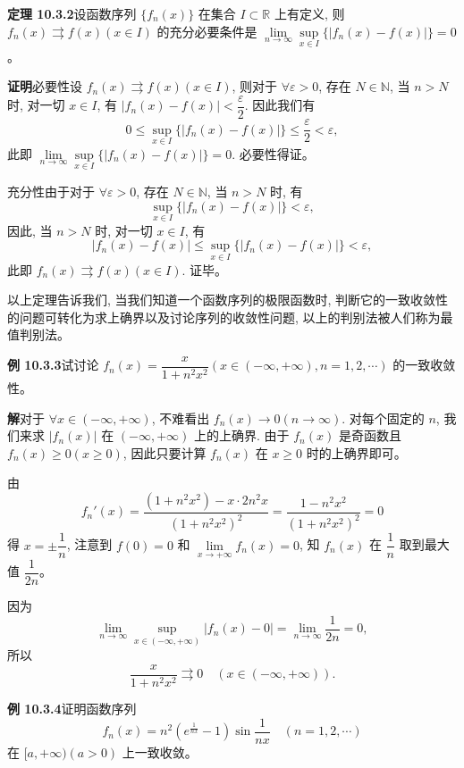 \documentclass[UTF8,12pt,a4paper,fontset=fandol]{ctexart}
\begin{document}
\noindent\textbf{定理 10.3.2}\quad 设函数序列 $\{f_n(x)\}$ 在集合 $I\subset\mathbb R$ 上有定义, 则 $f_n(x)\rightrightarrows f(x)(x\in I)$ 的充分必要条件是 $\lim\limits_{n\to\infty}\sup\limits_{x\in I}\{|f_n(x)-f(x)|\}=0$。

\noindent\textbf{证明}\quad 必要性\quad 设 $f_n(x)\rightrightarrows f(x)(x\in I)$, 则对于 $\forall\varepsilon>0$, 存在 $N\in\mathbb N$, 当 $n>N$ 时, 对一切 $x\in I$, 有 $|f_n(x)-f(x)|<\dfrac\varepsilon2$. 因此我们有
\[
  0\leq \sup_{x\in I}\{|f_n(x)-f(x)|\}\leq\frac\varepsilon2<\varepsilon,
\]
此即 $\lim\limits_{n\to\infty}\sup\limits_{x\in I}\{|f_n(x)-f(x)|\}=0$. 必要性得证。

充分性\quad 由于对于 $\forall\varepsilon>0$, 存在 $N\in\mathbb N$, 当 $n>N$ 时, 有
\[
  \sup_{x\in I}\{|f_n(x)-f(x)|\}<\varepsilon,
\]
因此, 当 $n>N$ 时, 对一切 $x\in I$, 有
\[
  |f_n(x)-f(x)|\leq \sup_{x\in I}\{|f_n(x)-f(x)|\}<\varepsilon,
\]
此即 $f_n(x)\rightrightarrows f(x)(x\in I)$. 证毕。

以上定理告诉我们, 当我们知道一个函数序列的极限函数时, 判断它的一致收敛性的问题可转化为求上确界以及讨论序列的收敛性问题, 以上的判别法被人们称为最值判别法。

\noindent\textbf{例 10.3.3}\quad 试讨论 $f_n(x)=\dfrac{x}{1+n^2x^2}(x\in(-\infty,+\infty), n=1,2,\cdots)$ 的一致收敛性。

\noindent\textbf{解}\quad 对于 $\forall x\in(-\infty,+\infty)$, 不难看出 $f_n(x)\to0(n\to\infty)$. 对每个固定的 $n$, 我们来求 $|f_n(x)|$ 在 $(-\infty,+\infty)$ 上的上确界. 由于 $f_n(x)$ 是奇函数且 $f_n(x)\geq0(x\geq0)$, 因此只要计算 $f_n(x)$ 在 $x\geq0$ 时的上确界即可。

由
\[
  f_n'(x)=\frac{(1+n^2x^2)-x\cdot2n^2x}{(1+n^2x^2)^2}
  =\frac{1-n^2x^2}{(1+n^2x^2)^2}=0
\]
得 $x=\pm\dfrac1n$, 注意到 $f(0)=0$ 和 $\lim\limits_{x\to+\infty}f_n(x)=0$, 知 $f_n(x)$ 在 $\dfrac1n$ 取到最大值 $\dfrac1{2n}$。

因为
\[
  \lim_{n\to\infty}\sup_{x\in(-\infty,+\infty)}|f_n(x)-0|
  =\lim_{n\to\infty}\frac1{2n}=0,
\]
所以
\[
  \frac{x}{1+n^2x^2}\rightrightarrows0\quad(x\in(-\infty,+\infty)).
\]

\noindent\textbf{例 10.3.4}\quad 证明函数序列
\[
  f_n(x)=n^2\left(e^{\frac1{nx}}-1\right)\sin\frac1{nx}\quad(n=1,2,\cdots)
\]
在 $[a,+\infty)(a>0)$ 上一致收敛。
\end{document}
